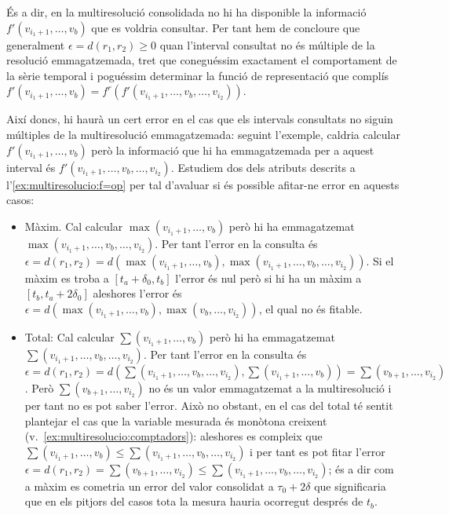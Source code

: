 \begin{itemize}
  És a dir, en la multiresolució consolidada no hi ha disponible la
  informació $f'(v_{i_1+1},\dotsc,v_{b})$ que es voldria consultar.
  Per tant hem de concloure que generalment $\epsilon=d(r_1,r_2)\geq
  0$ quan l'interval consultat no és múltiple de la resolució
  emmagatzemada, tret que coneguéssim exactament el comportament de la
  sèrie temporal i poguéssim determinar la funció de representació que complís 
  $ f'(v_{i_1+1},\dotsc,v_{b}) = f^r(f'(v_{i_1+1},\dotsc,v_{b},\dotsc,v_{i_2}))$.
\end{itemize}


Així doncs, hi haurà un cert error en el cas que els intervals
consultats no siguin múltiples de la multiresolució emmagatzemada:
seguint l'exemple, caldria calcular $f'(v_{i_1+1},\dotsc,v_{b})$ però
la informació que hi ha emmagatzemada per a aquest interval és
$f'(v_{i_1+1},\dotsc,v_{b},\dotsc,v_{i_2})$. Estudiem dos dels
atributs descrits a l'\autoref{ex:multiresolucio:f=op} per tal
d'avaluar si és possible afitar-ne error en aquests casos:

\begin{itemize}

\item Màxim. Cal calcular $\max(v_{i_1+1},\dotsc,v_{b})$ però hi ha
  emmagatzemat $\max(v_{i_1+1},\dotsc,v_{b},\dotsc,v_{i_2})$.  Per
  tant l'error en la consulta és $\epsilon=d(r_1,r_2)=
  d(\max(v_{i_1+1},\dotsc,v_{b}),\max(v_{i_1+1},\dotsc,v_{b},\dotsc,v_{i_2}))$. Si
  el màxim es troba a $[t_a+\delta_0,t_b]$ l'error és nul però si hi
  ha un màxim a $[t_b,t_a+2\delta_0]$ aleshores l'error és
  $\epsilon=d(\max(v_{i_1+1},\dotsc,v_{b}),\max(v_{b},\dotsc,v_{i_2}))$,
  el qual no és fitable.
  
\item Total: Cal calcular $\sum(v_{i_1+1},\dotsc,v_{b})$ però hi ha
  emmagatzemat $\sum(v_{i_1+1},\dotsc,v_{b},\dotsc,v_{i_2})$. Per tant
  l'error en la consulta és $\epsilon=d(r_1,r_2)=d(
  \sum(v_{i_1+1},\dotsc,v_{b},\dotsc,v_{i_2}),\sum(v_{i_1+1},\dotsc,v_{b}))
  = \sum(v_{b+1},\dotsc,v_{i_2})$. Però $\sum(v_{b+1},\dotsc,v_{i_2})$
  no és un valor emmagatzemat a la multiresolució i per tant no es pot
  saber l'error. Això no obstant, en el cas del total té sentit
  plantejar el cas que la variable mesurada és monòtona creixent
  (v.~\autoref{ex:multiresolucio:comptadors}): aleshores es compleix
  que $\sum(v_{i_1+1},\dotsc,v_{b}) \leq
  \sum(v_{i_1+1},\dotsc,v_{b},\dotsc,v_{i_2})$ i per tant es pot fitar
  l'error $\epsilon=d(r_1,r_2) = \sum(v_{b+1},\dotsc,v_{i_2}) \leq  
  \sum(v_{i_1+1},\dotsc,v_{b},\dotsc,v_{i_2})$; és a dir com a màxim
  es cometria un error del valor consolidat a $\tau_0+2\delta$ que
  significaria que en els pitjors del casos tota la mesura hauria
  ocorregut després de $t_b$.


\end{itemize}






